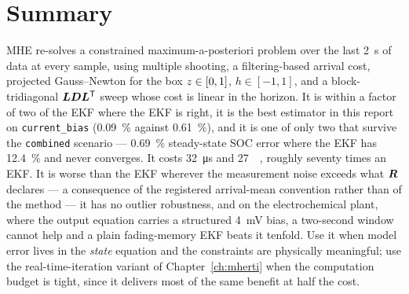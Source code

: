 \section{Summary}
MHE re-solves a constrained maximum-a-posteriori problem over the last \SI{2}{\second} of data at
every sample, using multiple shooting, a filtering-based arrival cost, projected Gauss--Newton for
the box $z\in[0,1]$, $h\in[-1,1]$, and a block-tridiagonal $\bm{L}\bm{D}\bm{L}^{\mathsf{T}}$ sweep whose cost is
linear in the horizon.  It is within a factor of two of the EKF where the EKF is right, it is the
best estimator in this report on \texttt{current\_bias} (\SI{0.09}{\percent} against
\SI{0.61}{\percent}), and it is one of only two that survive the \texttt{combined} scenario ---
\SI{0.69}{\percent} steady-state SOC error where the EKF has \SI{12.4}{\percent} and never
converges.  It costs \SI{32}{\micro\second} and \SI{27}{\kilo\byte}, roughly seventy times an EKF.
It is worse than the EKF wherever the measurement noise exceeds what $\bm{R}$ declares --- a
consequence of the registered arrival-mean convention rather than of the method --- it has no
outlier robustness, and on the electrochemical plant, where the output equation carries a
structured \SI{4}{\milli\volt} bias, a two-second window cannot help and a plain fading-memory EKF
beats it tenfold.  Use it when model error lives in the \emph{state} equation and the constraints
are physically meaningful; use the real-time-iteration variant of Chapter~\ref{ch:mherti} when the
computation budget is tight, since it delivers most of the same benefit at half the cost.
